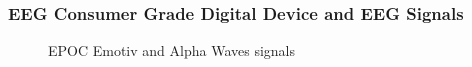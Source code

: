 \documentclass[aspectratio=169]{beamer}
\begin{document}
\begin{frame}   
\frametitle{EEG Consumer Grade Digital Device and EEG Signals}
\begin{figure}[]
\centering
\begin{columns}
\begin{column}{0.5\textwidth}
\setlength\fboxsep{0pt}
\setlength\fboxrule{0.5pt}
\end{column}
\begin{column}{0.5\textwidth}
\setlength\fboxsep{0pt}
\setlength\fboxrule{0.5pt}
\end{column}
\end{columns}
\caption{EPOC Emotiv and Alpha Waves signals}
\label{fig:digitalelectroencephalograph}
\end{figure}
\end{frame}
\end{document}
